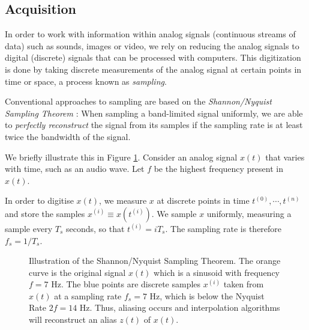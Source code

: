 \subsection{Acquisition}
In order to work with information within analog signals (continuous streams of data) such as sounds, images or video, we rely on reducing the analog signals to digital (discrete) signals that can be processed with computers.
This digitization is done by taking discrete measurements of the analog signal at certain points in time or space, a process known as \emph{sampling}.

Conventional approaches to sampling are based on the \emph{Shannon/Nyquist Sampling Theorem} \cite{shannon1949}:
When sampling a band-limited signal uniformly, we are able to \emph{perfectly reconstruct} the signal from its samples if the sampling rate is at least twice the bandwidth of the signal.

We briefly illustrate this in Figure \ref{fig:nyquist}.
Consider an analog signal $x(t)$ that varies with time, such as an audio wave.
Let $f$ be the highest frequency present in $x(t)$.

In order to digitise $x(t)$, we measure $x$ at discrete points in time $t^{(0)}, \cdots, t^{(n)}$ and store the samples $x^{(i)} \equiv x(t^{(i)})$.
We sample $x$ uniformly, measuring a sample every $T_s$ seconds, so that $t^{(i)} = iT_s$.
The sampling rate is therefore $f_s = 1/T_s$.

\begin{figure}
\caption[Illustration of Nyquist Sampling]{Illustration of the Shannon/Nyquist Sampling Theorem. The orange curve is the original signal $x(t)$ which is a sinusoid with frequency $f = 7$ Hz. The blue points are discrete samples $x^{(i)}$ taken from $x(t)$ at a sampling rate $f_s = 7$ Hz, which is below the Nyquist Rate $2f = 14$ Hz. Thus, aliasing occurs and interpolation algorithms will reconstruct an alias $z(t)$ of $x(t)$.}
\label{fig:nyquist}
\end{figure}

